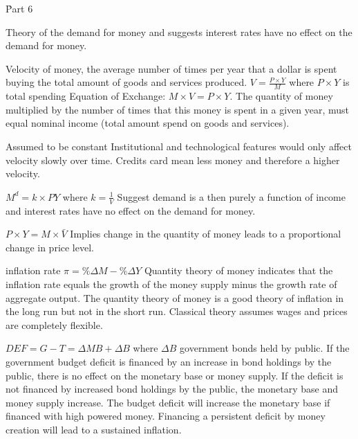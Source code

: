 \documentclass[12pt]{examnotes}
\begin{document}
\h{Part 6}


\ra Theory of the demand for money and suggests interest rates have no effect on the demand for money.

\ra Velocity of money, the average number of times per year that a dollar is spent buying the total amount of goods and services produced.
\ra $V=\frac{P \times Y}{M}$ where $P \times Y$ is total spending
\ra Equation of Exchange: $M\times V=P \times Y$. The quantity of money multiplied by the number of times that this money is spent in a given year, must equal nominal income (total amount spend on goods and services).

\ra Assumed to be constant
\ra Institutional and technological features would only affect velocity slowly over time.
\ra Credits card mean less money and therefore a higher velocity.

\ra $M^d=k \times PY$ where $k=\frac{1}{V}$
\ra Suggest demand is a then purely a function of income and interest rates have no effect on the demand for money.

\ra $P \times Y=M\times \bar{V}$
\ra Implies change in the quantity of money leads to a proportional change in price level.

\ra inflation rate $\pi = \%\Delta M- \%\Delta Y$
\ra Quantity theory of money indicates that the inflation rate equals the growth of the money supply minus the growth rate of aggregate output.
\ra The quantity theory of money is a good theory of inflation in the long run but not in the short run.
\ra Classical theory assumes wages and prices are completely flexible.

\ra $DEF = G - T = \Delta MB + \Delta B$ where $\Delta B$ government bonds held by public.
\ra If the government budget deficit is financed by an increase in bond holdings by the public, there is no effect on the monetary base or money supply.
\ra If the deficit is not financed by increased bond holdings by the public, the monetary base and money supply increase.
\ra The budget deficit will increase the monetary base if financed with high powered money.
\ra Financing a persistent deficit by money creation will lead  to a sustained inflation.
\end{document}
